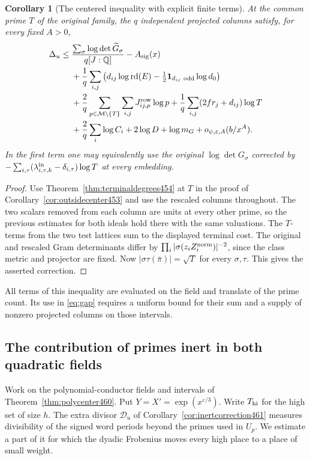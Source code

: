 \documentclass[a4paper,11pt]{article}
\newtheorem{corollary}[proposition]{Corollary}
\theoremstyle{definition}
\theoremstyle{remark}
\numberwithin{equation}{section}
\begin{document}
\begin{corollary}[The centered inequality with explicit finite terms]\leavevmode
\label{cor:allcost454}
At the common prime \(T\) of the original family, the \(q\)
independent projected columns satisfy, for every fixed \(A>0\),
\[
\begin{split}
 \Delta_u\le{}&
 \frac{\sum_\sigma\log\det\widetilde G_\sigma}{q[J:\mathbb Q]}
          -A_{\rm sig}(x)\\
 &+\frac1q\sum_{i,j}
  \left(d_{ij}\log\operatorname{rd}(E)
          -\tfrac12{\bf1}_{d_{ij}\ {\rm odd}}\log d_0\right)\\
 &+\frac2q\sum_{p\in\mathcal M\setminus\{T\}}
             \sum_{i,j}J^{\rm row}_{ij,p}\log p
   +\frac1q\sum_{i,j}(2fr_j+d_{ij})\log T\\
 &+\frac2q\sum_i\log C_i+2\log D+\log m_G
                         +o_{\psi,\varepsilon,A}(b/x^A).
\end{split}
\]
In the first term one may equivalently use the original
\(\log\det G_\sigma\) corrected by
\(-\sum_{i,\tau}(\lambda^{\rm in}_{i,\tau,k}-\delta_{i,\tau})\log T\)
at every embedding.
\end{corollary}
\begin{proof}
Use Theorem~\ref{thm:terminaldegrees454} at \(T\) in the proof
of Corollary~\ref{cor:outsidecenter453} and use the rescaled
columns throughout. The two scalars removed from each column
are units at every other prime, so the previous estimates for
both ideals hold there with the same valuations. The \(T\)-terms
from the two test lattices sum to the displayed terminal cost.
The original and rescaled Gram determinants differ by
\(\prod_i|\sigma(z_iZ_i^{\rm norm})|^{-2}\), since the
class metric and projector are fixed. Now
\(|\sigma\tau(\bar\pi)|=\sqrt T\) for every \(\sigma,\tau\).
This gives the asserted correction.
\end{proof}

All terms of this inequality are evaluated on the field and
translate of the prime count. Its use in \eqref{eq:gap} requires
a uniform bound for their sum and a supply of nonzero projected
columns on those intervals.


\subsection{The contribution of primes inert in both quadratic fields}
\label{sec:inertperiodmass462}

Work on the polynomial-conductor fields and intervals of
Theorem~\ref{thm:polycenter460}. Put \(Y=X'=\exp(x^{\varepsilon/3})\).
Write \(T_{\rm hi}\) for the high set of size \(h\).
The extra divisor \(\mathcal D_u\) of
Corollary~\ref{cor:inertcorrection461} measures divisibility of
the signed word periods beyond the primes used in \(U_p\).
We estimate a part of it for which the dyadic Frobenius moves
every high place to a place of small weight.
\end{document}
